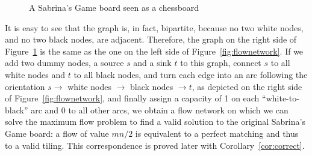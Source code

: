 \documentclass[svgnames,table,runningheads]{llncs}
\begin{document}
\begin{figure}
  \caption{A Sabrina's Game board seen as a chessboard}\label{fig:chess}
\end{figure}

\noindent It is easy to see that the graph is, in fact, bipartite, because no two white nodes, and no two black nodes, are adjacent. Therefore, the graph on the right side of Figure~\ref{fig:chess} is the same as the one on the left side of Figure~\ref{fig:flownetwork}. If we add two dummy nodes, a source \(s\) and a sink \(t\) to this graph, connect \(s\) to all white nodes and \(t\) to all black nodes, and turn each edge into an arc following the orientation \(s \rightarrow\)  white nodes \(\rightarrow\) black nodes \(\rightarrow t\), as depicted on the right side of Figure~\ref{fig:flownetwork}, and finally assign a capacity of 1 on each ``white-to-black'' arc and 0 to all other arcs, we obtain a flow network on which we can solve the maximum flow problem to find a valid solution to the original Sabrina's Game board: a flow of value $mn/2$ is equivalent to a perfect matching and thus to a valid tiling. This correspondence is proved later with Corollary~\ref{cor:correct}.
\end{document}

